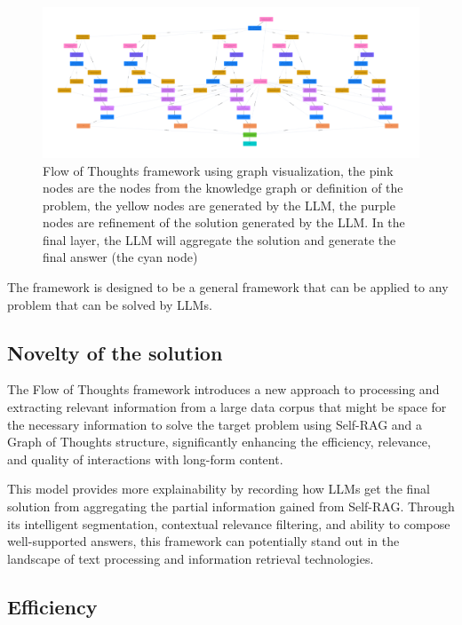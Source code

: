 \documentclass{article}
\begin{document}
    \begin{figure}[h]
        \centering
        \includegraphics[width=1.0\textwidth]{images/flow_of_thoughts.png}
        \caption{Flow of Thoughts framework using graph visualization, the pink nodes are the nodes from the knowledge graph or definition of the problem, the yellow nodes are generated by the LLM, the purple nodes are refinement of the solution generated by the LLM. In the final layer, the LLM will aggregate the solution and generate the final answer (the cyan node)}
        \label{fig:flow_of_thoughts}
    \end{figure}

    The framework is designed to be a general framework that can be applied to any problem that can be solved by LLMs.

\subsection{Novelty of the solution}

The Flow of Thoughts framework introduces a new approach to processing and extracting relevant information from a large data corpus that might be space for the necessary information to solve the target problem using Self-RAG and a Graph of Thoughts structure, significantly enhancing the efficiency, relevance, and quality of interactions with long-form content. 

This model provides more explainability by recording how LLMs get the final solution from aggregating the partial information gained from Self-RAG. Through its intelligent segmentation, contextual relevance filtering, and ability to compose well-supported answers, this framework can potentially stand out in the landscape of text processing and information retrieval technologies.

\subsection{Efficiency}
\end{document}
